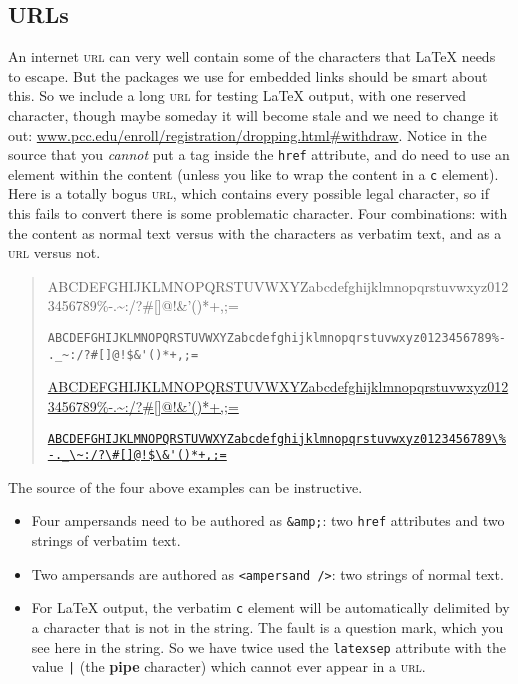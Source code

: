 \documentclass[10pt,]{article}
\newcommand{\terminology}[1]{\textbf{#1}}
\newcommand{\initialism}[1]{\textsc{\MakeLowercase{#1}}}
\theoremstyle{plain}
\theoremstyle{definition}
\theoremstyle{definition}
\theoremstyle{definition}
\theoremstyle{definition}
\theoremstyle{definition}
\theoremstyle{definition}
\numberwithin{equation}{section}
\begin{document}
\subsection[{URLs}]{URLs}\label{section-urls}
\hypertarget{p-218}{}%
An internet \initialism{URL} can very well contain some of the characters that \LaTeX{} needs to escape.  But the packages we use for embedded links should be smart about this.  So we include a long \initialism{URL} for testing \LaTeX{} output, with one reserved character, though maybe someday it will become stale and we need to change it out:  \href{http://www.pcc.edu/enroll/registration/dropping.html\#withdraw}{www.pcc.edu/enroll/registration/dropping.html\#withdraw}.  Notice in the source that you \emph{cannot} put a tag inside the \lstinline?href? attribute, and do need to use an element within the content (unless you like to wrap the content in a \lstinline?c? element).  Here is a totally bogus \initialism{URL}, which contains every possible legal character, so if this fails to convert there is some problematic character.  Four combinations: with the content as normal text versus with the characters as verbatim text, and as a \initialism{URL} versus not.%
\begin{quote}\hypertarget{blockquote-1}{}
\hypertarget{p-219}{}%
ABCDEFGHIJKLMNOPQRSTUVWXYZabcdefghijklmnopqrstuvwxyz0123456789\%-.\textunderscore{}\textasciitilde{}:/?\#[]@!\textdollar{}\&'()*+,;=%
\par
\hypertarget{p-220}{}%
\lstinline|ABCDEFGHIJKLMNOPQRSTUVWXYZabcdefghijklmnopqrstuvwxyz0123456789%-._~:/?#[]@!$&'()*+,;=|%
\par
\hypertarget{p-221}{}%
\href{ABCDEFGHIJKLMNOPQRSTUVWXYZabcdefghijklmnopqrstuvwxyz0123456789\%-._\~:/?\#[]@!$\&'()*+,;=}{ABCDEFGHIJKLMNOPQRSTUVWXYZabcdefghijklmnopqrstuvwxyz0123456789\%-.\textunderscore{}\textasciitilde{}:/?\#[]@!\textdollar{}\&'()*+,;=}%
\par
\hypertarget{p-222}{}%
\href{ABCDEFGHIJKLMNOPQRSTUVWXYZabcdefghijklmnopqrstuvwxyz0123456789\%-._\~:/?\#[]@!$\&'()*+,;=}{\lstinline|ABCDEFGHIJKLMNOPQRSTUVWXYZabcdefghijklmnopqrstuvwxyz0123456789\%-._\~:/?\#[]@!$\&'()*+,;=|}%
\end{quote}
\hypertarget{p-223}{}%
The source of the four above examples can be instructive.\leavevmode%
\begin{itemize}[label=\textbullet]
\item{}\hypertarget{p-224}{}%
Four ampersands need to be authored as \lstinline?&amp;?: two \lstinline?href? attributes and two strings of verbatim text.%
\item{}\hypertarget{p-225}{}%
Two ampersands are authored as \lstinline?<ampersand />?: two strings of normal text.%
\item{}\hypertarget{p-226}{}%
For \LaTeX{} output, the verbatim \lstinline?c? element will be automatically delimited by a character that is not in the string.  The fault is a question mark, which you see here in the string.  So we have twice used the \lstinline?latexsep? attribute with the value \lstinline?|? (the \terminology{pipe} character) which cannot ever appear in a \initialism{URL}.%
\end{itemize}
\end{document}
